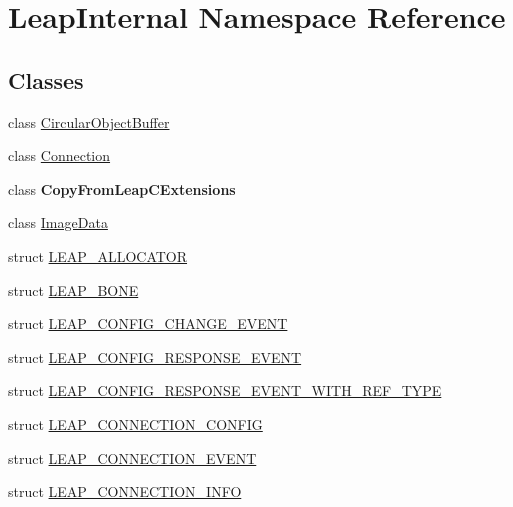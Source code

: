 \hypertarget{namespace_leap_internal}{}\section{Leap\+Internal Namespace Reference}
\label{namespace_leap_internal}
\subsection*{Classes}
\begin{DoxyCompactItemize}
\item 
class \mbox{\hyperlink{class_leap_internal_1_1_circular_object_buffer}{Circular\+Object\+Buffer}}
\item 
class \mbox{\hyperlink{class_leap_internal_1_1_connection}{Connection}}
\item 
class {\bfseries Copy\+From\+Leap\+C\+Extensions}
\item 
class \mbox{\hyperlink{class_leap_internal_1_1_image_data}{Image\+Data}}
\item 
struct \mbox{\hyperlink{struct_leap_internal_1_1_l_e_a_p___a_l_l_o_c_a_t_o_r}{L\+E\+A\+P\+\_\+\+A\+L\+L\+O\+C\+A\+T\+OR}}
\item 
struct \mbox{\hyperlink{struct_leap_internal_1_1_l_e_a_p___b_o_n_e}{L\+E\+A\+P\+\_\+\+B\+O\+NE}}
\item 
struct \mbox{\hyperlink{struct_leap_internal_1_1_l_e_a_p___c_o_n_f_i_g___c_h_a_n_g_e___e_v_e_n_t}{L\+E\+A\+P\+\_\+\+C\+O\+N\+F\+I\+G\+\_\+\+C\+H\+A\+N\+G\+E\+\_\+\+E\+V\+E\+NT}}
\item 
struct \mbox{\hyperlink{struct_leap_internal_1_1_l_e_a_p___c_o_n_f_i_g___r_e_s_p_o_n_s_e___e_v_e_n_t}{L\+E\+A\+P\+\_\+\+C\+O\+N\+F\+I\+G\+\_\+\+R\+E\+S\+P\+O\+N\+S\+E\+\_\+\+E\+V\+E\+NT}}
\item 
struct \mbox{\hyperlink{struct_leap_internal_1_1_l_e_a_p___c_o_n_f_i_g___r_e_s_p_o_n_s_e___e_v_e_n_t___w_i_t_h___r_e_f___t_y_p_e}{L\+E\+A\+P\+\_\+\+C\+O\+N\+F\+I\+G\+\_\+\+R\+E\+S\+P\+O\+N\+S\+E\+\_\+\+E\+V\+E\+N\+T\+\_\+\+W\+I\+T\+H\+\_\+\+R\+E\+F\+\_\+\+T\+Y\+PE}}
\item 
struct \mbox{\hyperlink{struct_leap_internal_1_1_l_e_a_p___c_o_n_n_e_c_t_i_o_n___c_o_n_f_i_g}{L\+E\+A\+P\+\_\+\+C\+O\+N\+N\+E\+C\+T\+I\+O\+N\+\_\+\+C\+O\+N\+F\+IG}}
\item 
struct \mbox{\hyperlink{struct_leap_internal_1_1_l_e_a_p___c_o_n_n_e_c_t_i_o_n___e_v_e_n_t}{L\+E\+A\+P\+\_\+\+C\+O\+N\+N\+E\+C\+T\+I\+O\+N\+\_\+\+E\+V\+E\+NT}}
\item 
struct \mbox{\hyperlink{struct_leap_internal_1_1_l_e_a_p___c_o_n_n_e_c_t_i_o_n___i_n_f_o}{L\+E\+A\+P\+\_\+\+C\+O\+N\+N\+E\+C\+T\+I\+O\+N\+\_\+\+I\+N\+FO}}

\end{DoxyCompactItemize}
